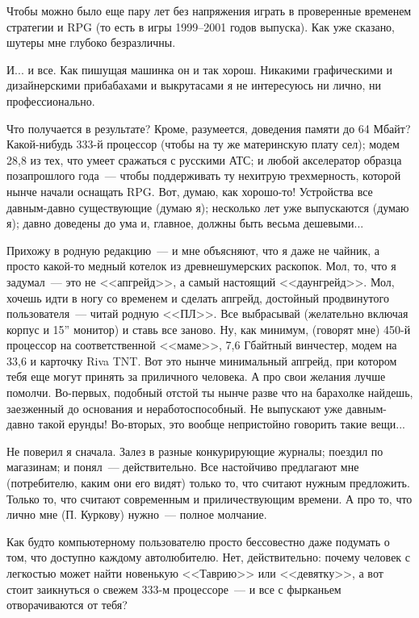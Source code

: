 \documentclass{scrbook}
\newcommand{\flqq}{<<}
\newcommand{\frqq}{>>}
\newcommand{\mdash}{~--- }
\newcommand{\ndash}{--}
\begin{document}
Чтобы можно было еще пару лет без напряжения играть в проверенные временем стратегии и RPG (то есть в игры 1999{\ndash}2001 годов выпуска). Как уже сказано, шутеры мне глубоко безразличны.

И... и все. Как пишущая машинка он и так хорош. Никакими графическими и дизайнерскими прибабахами и выкрутасами я не интересуюсь ни лично, ни профессионально.

Что получается в результате? Кроме, разумеется, доведения памяти до 64 Мбайт? Какой-нибудь 333-й процессор (чтобы на ту же материнскую плату сел); модем 28,8 из тех, что умеет сражаться с русскими АТС; и любой акселератор образца позапрошлого года{\mdash}чтобы поддерживать ту нехитрую трехмерность, которой нынче начали оснащать RPG. Вот, думаю, как хорошо-то! Устройства все давным-давно существующие (думаю я); несколько лет уже выпускаются (думаю я); давно доведены до ума и, главное, должны быть весьма дешевыми...

Прихожу в родную редакцию{\mdash}и мне объясняют, что я даже не чайник, а просто какой-то медный котелок из древнешумерских раскопок. Мол, то, что я задумал{\mdash}это не {\flqq}апгрейд{\frqq}, а самый настоящий {\flqq}даунгрейд{\frqq}. Мол, хочешь идти в ногу со временем и сделать апгрейд, достойный продвинутого пользователя{\mdash}читай родную {\flqq}ПЛ{\frqq}. Все выбрасывай (желательно включая корпус и 15'' монитор) и ставь все заново. Ну, как минимум, (говорят мне) 450-й процессор на соответственной {\flqq}маме{\frqq}, 7,6 Гбайтный винчестер, модем на 33,6 и карточку Riva TNT. Вот это нынче минимальный апгрейд, при котором тебя еще могут принять за приличного человека. А про свои желания лучше помолчи. Во-первых, подобный отстой ты нынче разве что на барахолке найдешь, заезженный до основания и неработоспособный. Не выпускают уже давным-давно такой ерунды! Во-вторых, это вообще непристойно говорить такие вещи...

Не поверил я сначала. Залез в разные конкурирующие журналы; поездил по магазинам; и понял{\mdash}действительно. Все настойчиво предлагают мне (потребителю, каким они его видят) только то, что считают нужным предложить. Только то, что считают современным и приличествующим времени. А про то, что лично мне (П. Куркову) нужно{\mdash}полное молчание.

Как будто компьютерному пользователю просто бессовестно даже подумать о том, что доступно каждому автолюбителю. Нет, действительно: почему человек с легкостью может найти новенькую {\flqq}Таврию{\frqq} или {\flqq}девятку{\frqq}, а вот стоит заикнуться о свежем 333-м процессоре{\mdash}и все с фырканьем отворачиваются от тебя?
\end{document}
